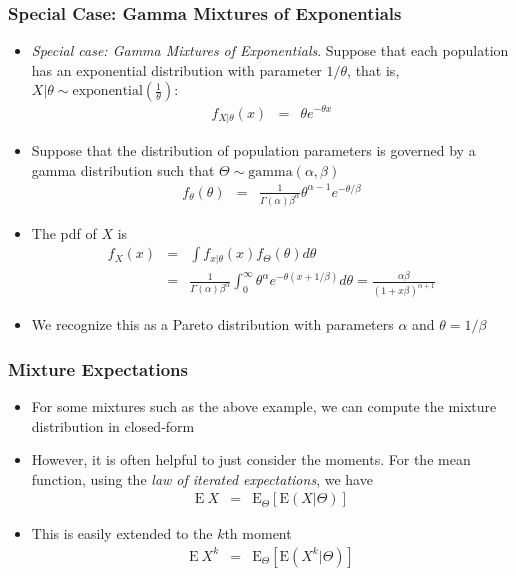 \documentclass{beamer}
\begin{document}
\begin{frame}%
\frametitle{Special Case: Gamma Mixtures of Exponentials}
\begin{itemize}
\item \textit{Special case: Gamma Mixtures of Exponentials}. Suppose that each population has an exponential distribution with parameter $1/\theta$, that is, $X|\theta \sim \text{exponential}(\frac{1}{\theta})$:
\begin{eqnarray*}
f_{X|\theta}(x) &=& \theta e^{-\theta x}
\end{eqnarray*} %
\item Suppose that the distribution of population parameters is governed by a gamma distribution such that $\Theta \sim \text{gamma}(\alpha, \beta)$ %
\begin{eqnarray*}
f_{\theta}(\theta) &=&
\frac{1}{\Gamma(\alpha)\beta^{\alpha}}\theta^{\alpha-1}e^{-\theta/\beta}
\end{eqnarray*} %

\item The pdf of $X$ is
\begin{eqnarray*}
f_X (x) &=&\int f_{x | \theta}(x) f_{\Theta}(\theta) d\theta \\
&=& \frac{1}{\Gamma(\alpha)\beta^{\alpha}}\int_0 ^{\infty}
\theta^{\alpha} e^{{-\theta}(x+1/\beta)}d\theta = \frac{\alpha
\beta}{(1+x\beta)^{\alpha+1}}
\end{eqnarray*} %
\item We recognize this as a Pareto distribution with parameters $\alpha$ and $\theta=1/\beta $
\end{itemize}
\end{frame}

\begin{frame}[shrink=2]
\frametitle{Mixture Expectations}
\begin{itemize}
\item For some mixtures such as the above example, we can compute the
mixture distribution in closed-form \vspace{2mm}

\item However, it is often helpful to
just consider the moments. For the mean function, using the
\textit{law of iterated expectations}, we have
\begin{eqnarray*}
\mathrm{E~}X &=& \mathrm{E}_{\Theta}[\mathrm{E}(X|\Theta)]
\end{eqnarray*} \vspace{2mm}

\item This is easily extended to the $k$th moment
\begin{eqnarray*}
\mathrm{E~}X^k &=& \mathrm{E}_{\Theta}[\mathrm{E}(X^k|\Theta)]
\end{eqnarray*}
\end{itemize}
\end{frame}
\end{document}
